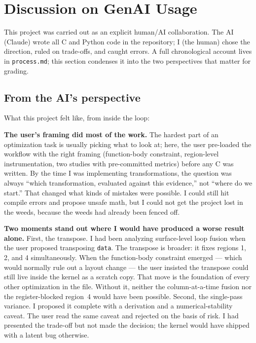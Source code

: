 \documentclass[11pt]{article}
\begin{document}
\section{Discussion on GenAI Usage}
\label{sec:genai}

This project was carried out as an explicit human/AI collaboration. The AI (Claude) wrote all C and Python code in the repository; I (the human) chose the direction, ruled on trade-offs, and caught errors. A full chronological account lives in \texttt{process.md}; this section condenses it into the two perspectives that matter for grading.

\subsection{From the AI's perspective}

What this project felt like, from inside the loop:

\textbf{The user's framing did most of the work.} The hardest part of an optimization task is usually picking what to look at; here, the user pre-loaded the workflow with the right framing (function-body constraint, region-level instrumentation, two studies with pre-committed metrics) before any C was written. By the time I was implementing transformations, the question was always ``which transformation, evaluated against this evidence,'' not ``where do we start.'' That changed what kinds of mistakes were possible. I could still hit compile errors and propose unsafe math, but I could not get the project lost in the weeds, because the weeds had already been fenced off.

\textbf{Two moments stand out where I would have produced a worse result alone.} First, the transpose. I had been analyzing surface-level loop fusion when the user proposed transposing \texttt{data}. The transpose is broader: it fixes regions 1, 2, and 4 simultaneously. When the function-body constraint emerged --- which would normally rule out a layout change --- the user insisted the transpose could still live inside the kernel as a scratch copy. That move is the foundation of every other optimization in the file. Without it, neither the column-at-a-time fusion nor the register-blocked region~4 would have been possible. Second, the single-pass variance. I proposed it complete with a derivation and a numerical-stability caveat. The user read the same caveat and rejected on the basis of risk. I had presented the trade-off but not made the decision; the kernel would have shipped with a latent bug otherwise.
\end{document}
